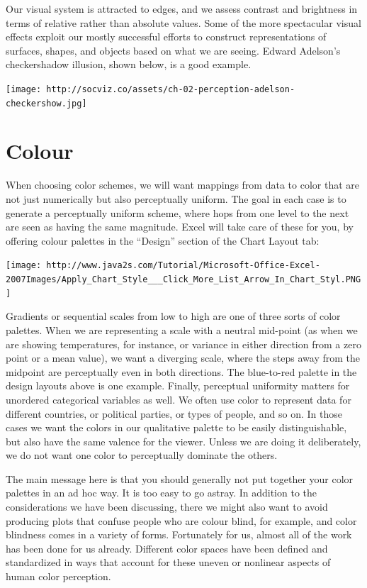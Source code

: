 \documentclass[]{book}
\theoremstyle{definition}
\theoremstyle{definition}
\theoremstyle{definition}
\theoremstyle{remark}
\begin{document}
Our visual system is attracted to edges, and we assess contrast and
brightness in terms of relative rather than absolute values. Some of the
more spectacular visual effects exploit our mostly successful efforts to
construct representations of surfaces, shapes, and objects based on what
we are seeing. Edward Adelson's checkershadow illusion, shown below, is
a good example.

\texttt{[image: http://socviz.co/assets/ch-02-perception-adelson-checkershow.jpg]}

\hypertarget{colour}{%
\section{Colour}\label{colour}}

When choosing color schemes, we will want mappings from data to color
that are not just numerically but also perceptually uniform. The goal in
each case is to generate a perceptually uniform scheme, where hops from
one level to the next are seen as having the same magnitude. Excel will
take care of these for you, by offering colour palettes in the
``Design'' section of the Chart Layout tab:

\texttt{[image: http://www.java2s.com/Tutorial/Microsoft-Office-Excel-2007Images/Apply\_Chart\_Style\_\_\_Click\_More\_List\_Arrow\_In\_Chart\_Styl.PNG]}

Gradients or sequential scales from low to high are one of three sorts
of color palettes. When we are representing a scale with a neutral
mid-point (as when we are showing temperatures, for instance, or
variance in either direction from a zero point or a mean value), we want
a diverging scale, where the steps away from the midpoint are
perceptually even in both directions. The blue-to-red palette in the
design layouts above is one example. Finally, perceptual uniformity
matters for unordered categorical variables as well. We often use color
to represent data for different countries, or political parties, or
types of people, and so on. In those cases we want the colors in our
qualitative palette to be easily distinguishable, but also have the same
valence for the viewer. Unless we are doing it deliberately, we do not
want one color to perceptually dominate the others.

The main message here is that you should generally not put together your
color palettes in an ad hoc way. It is too easy to go astray. In
addition to the considerations we have been discussing, there we might
also want to avoid producing plots that confuse people who are colour
blind, for example, and color blindness comes in a variety of forms.
Fortunately for us, almost all of the work has been done for us already.
Different color spaces have been defined and standardized in ways that
account for these uneven or nonlinear aspects of human color perception.
\end{document}
